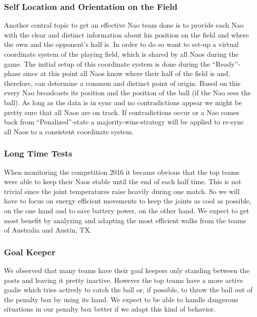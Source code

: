 \documentclass[12pt]{article}
\theoremstyle{definition}
\begin{document}
\subsubsection{Self Location and Orientation on the Field}
Another central topic to get an effective Nao team done is to provide each Nao with the clear and distinct information about his position on the field and where the own and the opponent's half is. In order to do so want to set-up a virtual coordinate system of the playing field, which is shared by all Naos during the game. The initial setup of this coordinate system is done during the “Ready”-phase since at this point all Naos know where their half of the field is and, therefore, can determine a common and distinct point of origin. Based on this every Nao broadcasts its position and the position of the ball (if the Nao sees the ball). As long as the data is in sync and no contradictions appear we might be pretty sure that all Naos are on track. If contradictions occur or a Nao comes back from “Penalized”-state a majority-wins-strategy will be applied to re-sync all Naos to a consistent coordinate system.


\subsubsection{Long Time Tests}
When monitoring the competition 2016 it became obvious that the top teams were able to keep their Naos stable until the end of each half time. This is not trivial since the joint temperatures raise heavily during one match. So we will have to focus on energy efficient movements to keep the joints as cool as possible, on the one hand and to save battery power, on the other hand. We expect to get most benefit by analyzing and adapting the most efficient walks from the teams of Australia and Austin, TX.

\subsubsection{Goal Keeper}
We observed that many teams have their goal keepers only standing between the posts and leaving it pretty inactive. However the top teams have a more active goalie which tries actively to catch the ball or, if possible, to throw the ball out of the penalty box by using its hand. We expect to be able to handle dangerous situations in our penalty box better if we adapt this kind of behavior.
\end{document}
